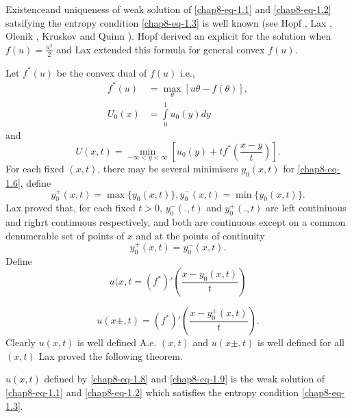 Existence\pageoriginale and uniqueness of weak solution of \eqref{chap8-eq-1.1} and \eqref{chap8-eq-1.2} satsifying the entropy condition \eqref{chap8-eq-1.3} is well known (see Hopf \cite{chap8-key2}, Lax \cite{chap8-key9}, Olenik \cite{chap8-key14}, Kruskov \cite{chap8-key7} and Quinn \cite{chap8-key13}). Hopf \cite{chap8-key2} derived an explicit for the solution when $f(u) = \frac{u^{2}}{2}$ and Lax \cite{chap8-key9} extended this formula for general convex $f(u)$.

Let $f^{*}(u)$ be the convex dual of $f(u)$ i.e.,
\begin{align}
f^{*}(u) &= \max\limits_{\theta}[u\theta - f(\theta)],\label{chap8-eq-1.4}\\
U_{0}(x)&= \int\limits_{0}^{1} u_{0}(y)dy \label{chap8-eq-1.5}
\end{align}
and
\begin{equation}\label{chap8-eq-1.6}
U(x, t) = \min\limits_{-\infty < y < \infty}\left[u_{0}(y) + tf^{*}\left(\dfrac{x-y}{t}\right) \right].
\end{equation}
For each fixed $(x, t)$, there may be several minimisers $y_{0}(x,t)$ for \eqref{chap8-eq-1.6}, define
\begin{equation}\label{chap8-eq-1.7}
y_{0}^{+}(x,t)=\max\{y_{0}(x,t)\},y_{0}^{-}(x,t)= \min\{y_{0}(x,t)\}. 
\end{equation}
Lax \cite{chap8-key9} proved that, for each fixed $t > 0$, $y_{0}^{-}(.,t)$ and $y_{0}^{+}(., t)$ are left continiuous and righrt continuous respectively, and both are continuous except on a common denumerable set of points of $x$ and at the points of continuity
$$
y_{0}^{+}(x,t) =y_{0}^{-}(x,t).
$$
Define
\begin{equation}\label{chap8-eq-1.8}
u(x,t  =(f^{*})'\left(\dfrac{x-y_{0}(x,t)}{t}\right)
\end{equation}

\begin{equation}\label{chap8-eq-1.9}
u(x \pm, t) = (f^{*})' \left(\dfrac{x-y_{0}^{\pm}(x,t)}{t}\right).
\end{equation}
Clearly $u(x,t)$ is well defined A.e. $(x,t)$ and $u(x \pm, t)$ is well defined for all $(x, t)$ Lax \cite{chap8-key9} proved the following theorem.

\setcounter{thm}{0}
\begin{thm}\label{chap8-thm-1}
$u(x,t)$ defined by \eqref{chap8-eq-1.8} and \eqref{chap8-eq-1.9} is the weak solution of \eqref{chap8-eq-1.1} and
\eqref{chap8-eq-1.2} which satisfies the entropy condition \eqref{chap8-eq-1.3}. 
\end{thm}

